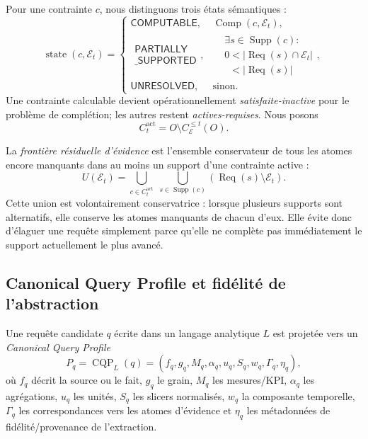 \documentclass[journal]{IEEEtran}
\begin{document}
Pour une contrainte $c$, nous distinguons trois états sémantiques :
\[
\operatorname{state}(c,\mathcal{E}_t)=
\begin{cases}
\mathsf{COMPUTABLE},
& \operatorname{Comp}(c,\mathcal{E}_t),\\[2mm]
\begin{gathered}
\mathsf{PARTIALLY}\\[-0.5mm]
\mathsf{\_SUPPORTED}
\end{gathered},
&
\begin{aligned}
&\exists s\in\operatorname{Supp}(c):\\[-0.5mm]
&0<|\operatorname{Req}(s)\cap\mathcal{E}_t|\\[-0.5mm]
&\phantom{0}<|\operatorname{Req}(s)|
\end{aligned},\\[2mm]
\mathsf{UNRESOLVED},
& \text{sinon}.
\end{cases}
\]
Une contrainte calculable devient opérationnellement \emph{satisfaite-inactive} pour le problème de complétion; les autres restent \emph{actives-requises}. Nous posons
\[
C_t^{\mathrm{act}}
=
O\setminus C_{\mathcal{E}}^{\le t}(O).
\]

La \emph{frontière résiduelle d'évidence} est l'ensemble conservateur de tous les atomes encore manquants dans au moins un support d'une contrainte active :
\begin{equation}
\label{eq:frontier}
U(\mathcal{E}_t)
=
\bigcup_{c\in C_t^{\mathrm{act}}}
\;
\bigcup_{s\in\operatorname{Supp}(c)}
\left(\operatorname{Req}(s)\setminus\mathcal{E}_t\right).
\end{equation}
Cette union est volontairement conservatrice : lorsque plusieurs supports sont alternatifs, elle conserve les atomes manquants de chacun d'eux. Elle évite donc d'élaguer une requête simplement parce qu'elle ne complète pas immédiatement le support actuellement le plus avancé.

\subsection{Canonical Query Profile et fidélité de l'abstraction}

Une requête candidate $q$ écrite dans un langage analytique $L$ est projetée vers un \emph{Canonical Query Profile}
\[
P_q=\operatorname{CQP}_L(q)
=
(f_q,g_q,M_q,\alpha_q,u_q,S_q,w_q,\Gamma_q,\eta_q),
\]
où $f_q$ décrit la source ou le fait, $g_q$ le grain, $M_q$ les mesures/KPI, $\alpha_q$ les agrégations, $u_q$ les unités, $S_q$ les slicers normalisés, $w_q$ la composante temporelle, $\Gamma_q$ les correspondances vers les atomes d'évidence et $\eta_q$ les métadonnées de fidélité/provenance de l'extraction.
\end{document}
